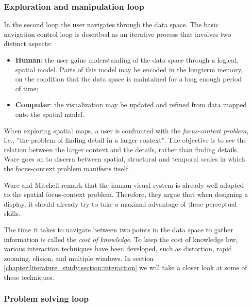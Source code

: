 \subsubsection{Exploration and manipulation loop}\label{chapter:literature_study:section:user:subsection:interactive:subsubsection:loops2}

In the second loop the user navigates through the data space. The basic navigation control loop is described as an iterative process that involves two distinct aspects\cite{ware:2004}:

\begin{itemize}
	\item \textbf{Human}: the user gains understanding of the data space through a logical, spatial model. Parts of this model may be encoded in the longterm memory, on the condition that the data space is maintained for a long enough period of time;
	\item \textbf{Computer}: the visualization may be updated and refined from data mapped onto the spatial model.
\end{itemize}

When exploring spatial maps, a user is confronted with the \emph{focus-context problem}, i.e., "the problem of finding detail in a larger context"\cite{ware:2004}. The objective is to see the relation between the larger context and the details, rather than finding details. Ware goes on to discern between spatial, structural and temporal scales in which the focus-context problem manifests itself\cite{ware:2004}.

Ware and Mitchell remark that the human visual system is already well-adapted to the spatial focus-context problem\cite{ware:2004}. Therefore, they argue that when designing a display, it should already try to take a maximal advantage of these perceptual skills.

The time it takes to navigate between two points in the data space to gather information is called the \emph{cost of knowledge}\cite{ware:2004}. To keep the cost of knowledge low, various interaction techniques have been developed, such as distortion, rapid zooming, elision, and multiple windows\cite{ware:2004}. In section \ref{chapter:literature_study:section:interaction} we will take a closer look at some of these techniques.


\subsubsection{Problem solving loop}\label{chapter:literature_study:section:user:subsection:interactive:subsubsection:loops3}

